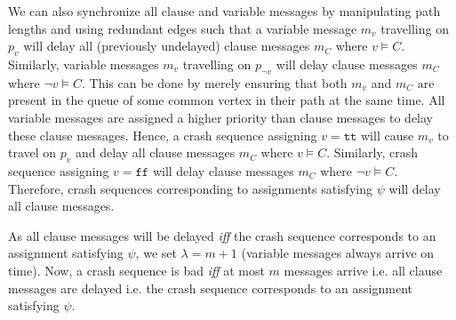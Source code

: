\documentclass[11pt,eepic]{article}
\renewcommand{\tt}{\texttt{tt}}
\newcommand{\ff}{\texttt{ff}}
\begin{document}
	We can also synchronize all clause and variable messages by manipulating path lengths and using redundant edges such that a variable message $m_v$ travelling on $p_v$ will delay all (previously undelayed) clause messages $m_C$ where $v \models C$. Similarly, variable messages $m_v$ travelling on $p_{\neg v}$ will delay clause messages $m_C$ where $\neg v \models C$. This can be done by merely ensuring that both $m_v$ and $m_C$ are present in the queue of some common vertex in their path at the same time. All variable messages are assigned a higher priority than clause messages to delay these clause messages.
	Hence, a crash sequence assigning $v = \tt$ will cause $m_v$ to travel on $p_v$ and delay all clause messages $m_C$ where $v \models C$. Similarly, crash sequence assigning $v = \ff$ will delay clause messages $m_C$ where $\neg v \models C$. Therefore, crash sequences corresponding to assignments satisfying $\psi$ will delay all clause messages.

	As all clause messages will be delayed {\it iff} the crash sequence corresponds to an assignment satisfying $\psi$, we set $\lambda = m+1$ (variable messages always arrive on time). Now, a crash sequence is bad {\it iff} at most $m$ messages arrive i.e. all clause messages are delayed i.e. the crash sequence corresponds to an assignment satisfying $\psi$.



\end{document}
